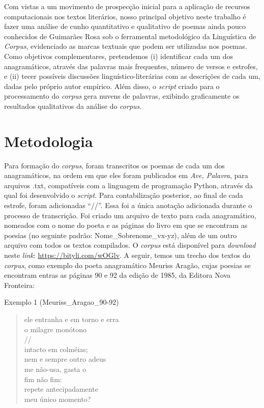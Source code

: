 \documentclass[portuguese]{textolivre}
\begin{document}
Com vistas a um movimento de prospecção inicial para a aplicação de recursos computacionais nos textos literários, nosso principal objetivo neste trabalho é fazer uma análise de cunho quantitativo e qualitativo de poemas ainda pouco conhecidos de Guimarães Rosa sob o ferramental metodológico da Linguística de \textit{Corpus}, evidenciado as marcas textuais que podem ser utilizadas nos poemas. Como objetivos complementares, pretendemos (i) identificar cada um dos anagramáticos, através das palavras mais frequentes, número de versos e estrofes, e (ii) tecer possíveis discussões linguístico-literárias com as descrições de cada um, dadas pelo próprio autor empírico. Além disso, o \textit{script} criado para o processamento do \textit{corpus} gera nuvens de palavras, exibindo graficamente os resultados qualitativos da análise do \textit{corpus}. 

\section{Metodologia}\label{sec-normas}
Para formação do \textit{corpus}, foram transcritos os poemas de cada um dos anagramáticos, na ordem em que eles foram publicados em \textit{Ave, Palavra}, para arquivos .txt, compatíveis com a linguagem de programação Python, através da qual foi desenvolvido o \textit{script}. Para contabilização posterior, ao final de cada estrofe, foram adicionadas “//”. Essa foi a única anotação adicionada durante o processo de transcrição. Foi criado um arquivo de texto para cada anagramático, nomeados com o nome do poeta e as páginas do livro em que se encontram as poesias (no seguinte padrão: Nome\_Sobrenome\_vx-yz), além de um outro arquivo com todos os textos compilados. O \textit{corpus} está disponível para \textit{download} neste \textit{link}: \url{https://bityli.com/wOGlv}. A seguir, temos um trecho dos textos do \textit{corpus}, como exemplo do poeta anagramático Meuriss Aragão, cujas poesias se encontram entras as páginas 90 e 92 da edição de 1985, da Editora Nova Fronteira:

Exemplo 1 (Meuriss\_Aragao\_90-92)

\begin{quote}
ele entranha e em torno e erra\\
o milagre monótono\\
//\\
intacto em colméias;\\
nem e sempre outro adeus\\
me não-usa, gasta o\\
fim não fim:\\
repete antecipadamente\\
meu único momento?\\
\end{quote}
\end{document}
